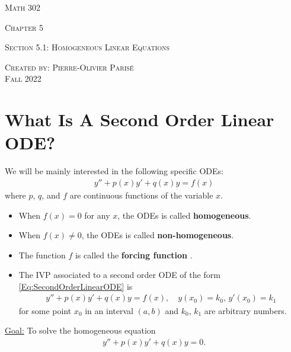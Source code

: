 \documentclass[12pt,a4paper]{article}
\begin{document}
\thispagestyle{empty}

\begin{center}
\vspace*{2.5cm}

{\Huge \textsc{Math 302}}

\vspace*{2cm}

{\LARGE \textsc{Chapter 5}} 

\vspace*{0.75cm}

\noindent\textsc{Section 5.1: Homogeneous Linear Equations}

\vspace*{0.75cm}

\tableofcontents

\vfill

\noindent \textsc{Created by: Pierre-Olivier Paris{\'e}} \\
\textsc{Fall 2022}
\end{center}

\newpage

\section{What Is A Second Order Linear ODE?}

We will be mainly interested in the following specific ODEs:
	\begin{align}
	y'' + p(x) y' + q(x) y = f(x) \label{Eq:SecondOrderLinearODE}
	\end{align}
where $p$, $q$, and $f$ are continuous functions of the variable $x$.

	\begin{itemize}
	\item When $f(x) = 0$ for any $x$, the ODEs is called \textbf{homogeneous}.
	\item When $f(x) \neq 0$, the ODEs is called \textbf{non-homogeneous}.
	\item The function $f$ is called the \textbf{forcing function} .
	\item The IVP associated to a second order ODE of the form \eqref{Eq:SecondOrderLinearODE} is
		\begin{align*}
		y'' + p(x) y' + q(x) y = f(x) , \quad y(x_0) = k_0 , \, y'(x_0) = k_1
		\end{align*}
	for some point $x_0$ in an interval $(a, b)$ and $k_0$, $k_1$ are arbitrary numbers.
	\end{itemize}
	
\underline{Goal:} To solve the homogeneous equation
	\begin{align*}
	y'' + p(x) y' + q(x) y = 0 .
	\end{align*}
	
\end{document}
